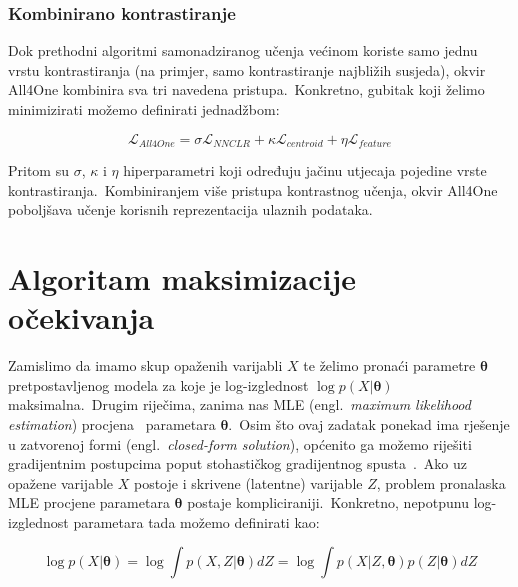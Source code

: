 \documentclass[diplomskirad]{fer}
\begin{document}
\pagebreak

\subsection{Kombinirano kontrastiranje}
\label{sub:all4one_combined}

Dok prethodni algoritmi samonadziranog učenja većinom koriste samo jednu vrstu kontrastiranja (na primjer, samo kontrastiranje najbližih susjeda), okvir All4One kombinira sva tri navedena pristupa.\ 
Konkretno, gubitak koji želimo minimizirati možemo definirati jednadžbom:

\begin{equation}
  \mathcal{L}_{All4One} = \sigma \mathcal{L}_{NNCLR} + \kappa \mathcal{L}_{centroid} + \eta \mathcal{L}_{feature}
  \label{eq:all4one_loss}
\end{equation}

Pritom su $\sigma$, $\kappa$ i $\eta$ hiperparametri koji određuju jačinu utjecaja pojedine vrste kontrastiranja.\ 
Kombiniranjem više pristupa kontrastnog učenja, okvir All4One poboljšava učenje korisnih reprezentacija ulaznih podataka.\

\chapter{Algoritam maksimizacije očekivanja}
\label{pog:em_algoritam}

Zamislimo da imamo skup opaženih varijabli $X$ te želimo pronaći parametre $\bm{\theta}$ pretpostavljenog modela za koje je log-izglednost $\log p(X | \bm{\theta})$ maksimalna.\ 
Drugim riječima, zanima nas MLE (engl.\ \textit{maximum likelihood estimation}) procjena~\cite{myung2003tutorial} parametara $\bm{\theta}$.\ 
Osim što ovaj zadatak ponekad ima rješenje u zatvorenoj formi (engl.\ \textit{closed-form solution}), općenito ga možemo riješiti gradijentnim postupcima poput stohastičkog gradijentnog spusta~\cite{amari1993backpropagation}.\ 
Ako uz opažene varijable $X$ postoje i skrivene (latentne) varijable $Z$, problem pronalaska MLE procjene parametara $\bm{\theta}$ postaje kompliciraniji.\  
Konkretno, nepotpunu log-izglednost parametara tada možemo definirati kao:

\begin{equation}
  \log p(X | \bm{\theta}) = \log \int p(X, Z | \bm{\theta}) dZ = \log \int p(X | Z, \bm{\theta}) p(Z |\bm{\theta}) dZ
  \label{eq:log_likelihood_latent}
\end{equation}
\end{document}
